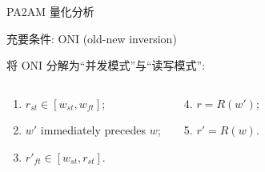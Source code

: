 \begin{frame}{PA2AM 量化分析}
  \vspace{0.10cm}

  充要条件: ONI (old-new inversion) 

  \pause
  将 ONI 分解为``并发模式''与``读写模式'':

  \begin{columns}
	  \begin{cdef}
		\begin{enumerate}
		  \item $r_{st} \in [w_{st}, w_{ft}]$;
		  \item $w'$ immediately precedes $w$;
		  \item $r'_{ft} \in [w_{st}, r_{st}]$.
		\end{enumerate}
	  \end{cdef}
	  \begin{cdef}
		\begin{enumerate}
		  \setcounter{enumi}{3}
		  \item $r = R(w')$;
		  \item $r' = R(w)$.
		\end{enumerate}
	  \end{cdef}
  \end{columns}
\end{frame}
